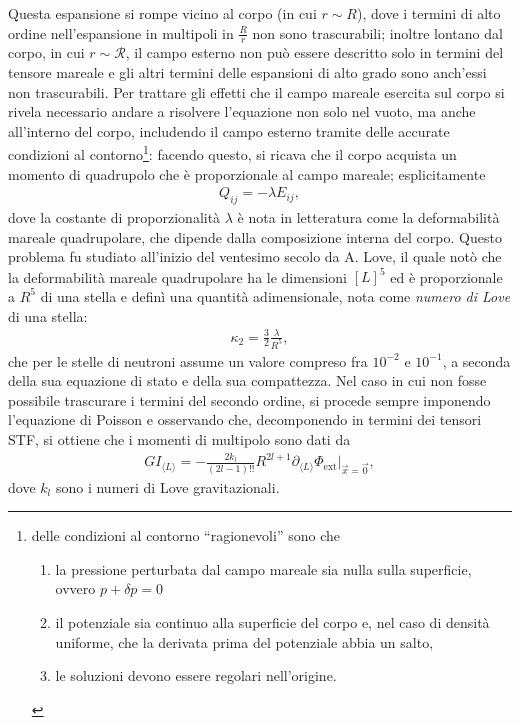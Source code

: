 Questa espansione si rompe vicino al corpo (in cui $r \sim R$), dove i termini di alto ordine nell'espansione in multipoli in $\frac{R}{r}$ non sono trascurabili; inoltre lontano dal corpo, in cui $r \sim \mathcal{R}$, il campo esterno non può essere descritto solo in termini del tensore mareale e gli altri termini delle espansioni di alto grado sono anch'essi non trascurabili. Per trattare gli effetti che il campo mareale esercita sul corpo si rivela necessario andare a risolvere l'equazione non solo nel vuoto, ma anche all'interno del corpo, includendo il campo esterno tramite delle accurate condizioni al contorno\footnote{delle condizioni al contorno ``ragionevoli'' sono che 
	\begin{enumerate}[label=\protect\circled{\arabic*}]
	\item la pressione perturbata dal campo mareale sia nulla sulla superficie, ovvero $p+\delta p = 0$ 
	\item il potenziale sia continuo alla superficie del corpo e, nel caso di densità uniforme, che la derivata prima del potenziale abbia un salto,
	\item le soluzioni devono essere regolari nell'origine.
\end{enumerate}
}: facendo questo, si ricava che il corpo acquista un momento di quadrupolo che è proporzionale al campo mareale; esplicitamente
\begin{align}
	Q_{ij} = - \lambda E_{ij},
\end{align}
dove la costante di proporzionalità $\lambda$ è nota in letteratura come la deformabilità mareale quadrupolare, che dipende dalla composizione interna del corpo. Questo problema fu studiato all'inizio del ventesimo secolo da A. Love, il quale notò che la deformabilità mareale quadrupolare ha le dimensioni $[L]^5$ ed è proporzionale a $R^5$ di una stella e definì una quantità adimensionale, nota come \emph{numero di Love} di una stella:
\begin{align}
	\kappa_2 = \frac32 \frac{\lambda}{R^5},
\end{align}
che per le stelle di neutroni assume un valore compreso fra $10^{-2}$ e $10^{-1}$, a seconda della sua equazione di stato e della sua compattezza. Nel caso in cui non fosse possibile trascurare i termini del secondo ordine, si procede sempre imponendo l'equazione di Poisson e osservando che, decomponendo in termini dei tensori STF, si ottiene che i momenti di multipolo sono dati da
\begin{align}
	G I_{\langle L \rangle} = -\frac{2k_l}{(2l-1)!!}R^{2l+1} \partial_{\langle L \rangle} \Phi_{\text{ext}} \bigg|_{\vec{x} = \vec{0}},
\end{align}
dove $k_l$ sono i numeri di Love gravitazionali.

